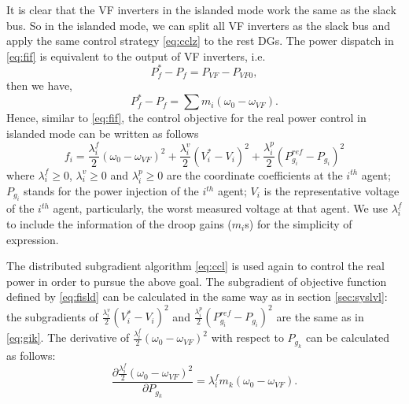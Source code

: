 \documentclass{article}
\begin{document}
It is clear that the VF inverters in the islanded mode work the same as the slack bus. So in the islanded mode, we can split all VF inverters as the slack bus and apply the same control strategy \eqref{eq:cclz} to the rest DGs.  
The power dispatch in \eqref{eq:fif} is equivalent to the output of VF inverters, i.e.
\begin{equation}
    P^*_{f}- P_f = P_{VF}- P_{VF0},
\end{equation}
then we have, 
\begin{equation}
    P^*_{f}- P_f = \sum m_i(\omega_0-\omega_{VF}).
\end{equation}
Hence, similar to \eqref{eq:fif}, the control objective for the real power control in islanded mode can be written as follows 
\begin{equation}
    f_i =\frac{\lambda^{f}_i}{2}(\omega_0-\omega_{VF})^2+
    \frac{\lambda^{v}_i}{2}(V_{i}^{*}-V_{i})^2+\frac{\lambda^p_i}{2}(P^{ref}_{g_i}-P_{g_i})^2 \label{eq:fisld}
\end{equation}
where $\lambda_i^{f}\geq 0$, $\lambda^{v}_i\geq 0$ and $\lambda^{p}_i\geq 0$ are the coordinate coefficients at the $i^{th}$ agent; $P_{g_i}$ stands for the power injection of the $i^{th}$ agent; $V_{i}$ is the representative voltage of the $i^{th}$ agent, particularly, the worst measured voltage at that agent. We use $\lambda^{f}_i$ to include the information of the droop gains ($m_i$s) for the simplicity of expression.

The distributed subgradient algorithm \eqref{eq:ccl} is used again to control the real power in order to pursue the above goal. The subgradient of objective function defined by \eqref{eq:fisld} can be calculated in the same way as in section \ref{sec:syslvl}: the subgradients of $\frac{\lambda^{v}_i}{2}(V_{i}^{*}-V_{i})^2$ and $\frac{\lambda^p_i}{2}(P^{ref}_{g_i}-P_{g_i})^2$ are the same as in \eqref{eq:gik}. The derivative of $\frac{\lambda^{f}_i}{2}(\omega_0-\omega_{VF})^2$ with respect to $P_{g_k}$ can be calculated as follows:
\begin{equation}
    \frac{\partial \frac{\lambda^{f}_i}{2}(\omega_0-\omega_{VF})^2 }{ \partial P_{g_k}} =\lambda^{f}_i m_k (\omega_0-\omega_{VF}).\label{eq:domg}
\end{equation}
\end{document}

